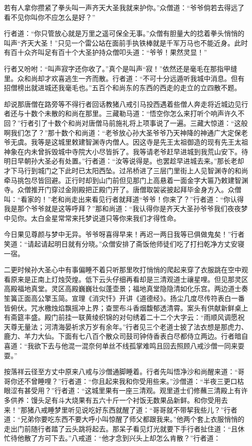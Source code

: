 \documentclass[12pt,UTF8]{ctexbook}
\begin{document}
若有人拿你攒紧了拳头叫一声齐天大圣我就来护你。”众僧道：“爷爷倘若去得远了看不见你叫你不应怎么是好？”

行者道：“你只管放心就是万里之遥可保全无事。”众僧有胆量大的捻着拳头悄悄的叫声“齐天大圣！”只见一个雷公站在面前手执铁棒就是千军万马也不能近身。此时有百十众齐叫足有百十个大圣护持众僧叩头道：“爷爷！果然灵显！”

行者又吩咐：“叫声寂字还你收了。”真个是叫声“寂！”依然还是毫毛在那指甲缝里。众和尚却才欢喜逃生一齐而散。行者道：“不可十分远遁听我城中消息。但有招僧榜出就进城还我毫毛也。”五百个和尚东的东西的西走的走立的立四散不题。

却说那唐僧在路旁等不得行者回话教猪八戒引马投西遇着些僧人奔走将近城边见行者还与十数个未散的和尚在那里。三藏勒马道：“悟空你怎么来打听个响声许久不回？”行者引了十数个和尚对唐僧马前施礼将上项事说了一遍。三藏大惊道：“这般啊我们怎了？”那十数个和尚道：“老爷放心孙大圣爷爷乃天神降的神通广大定保老爷无虞。我等是这城里敕建智渊寺内僧人。因这寺是先王太祖御造的现有先王太祖神象在内未曾拆毁城中寺院大小尽皆拆了。我等请老爷赶早进城到我荒山安下。待明日早朝孙大圣必有处置。”行者道：“汝等说得是。也罢趁早进城去来。”那长老却才下马行到城门之下此时已太阳西坠。过吊桥进了三层门里街上人见智渊寺的和尚牵马挑包尽皆回避。正行时却到山门前但见那门上高悬着一面金字大匾乃敕建智渊寺。众僧推开门穿过金刚殿把正殿门开了。唐僧取袈裟披起拜毕金身方入。众僧叫：“看家的！”老和尚走出来看见行者就拜道“爷爷！你来了？”行者道：“你认得我是那个爷爷就是这等呼拜？”那和尚道：“我认得你是齐天大圣孙爷爷我们夜夜梦中见你。太白金星常常来托梦说道只等你来我们才得性命。

今日果见尊颜与梦中无异。爷爷呀喜得早来！再迟一两日我等已俱做鬼矣！”行者笑道：“请起请起明日就有分晓。”众僧安排了斋饭他师徒们吃了打扫乾净方丈安寝一宿。

二更时候孙大圣心中有事偏睡不着只听那里吹打悄悄的爬起来穿了衣服跳在空中观看原来是正南上灯烛荧煌。低下云头仔细再看却是三清观道士禳星哩。但见那灵区高殿福地真堂。灵区高殿巍巍壮似蓬壶景；福地真堂隐隐清如化乐宫。两边道士奏笙簧正面高公擎玉简。宣理《消灾忏》开讲《道德经》。扬尘几度尽传符表白一番皆俯伏。咒水檄烛焰飘摇冲上界；查罡布斗香烟馥郁透清霄。案头有供献新鲜桌上有斋筵丰盛。殿门前挂一联黄绫织锦的对句绣着二十二个大字云：“雨顺风调愿祝天尊无量法；河清海晏祈求万岁有余年。”行者见三个老道士披了法衣想是那虎力、鹿力、羊力大仙。下面有七八百个散众司鼓司钟侍香表白尽都侍立两边。行者暗自喜道：“我欲下去与他混一混奈何单丝不线孤掌难鸣且回去照顾八戒沙僧一同来耍耍。”

按落祥云径至方丈中原来八戒与沙僧通脚睡着。行者先叫悟净沙和尚醒来道：“哥哥你还不曾睡哩？”行者道：“你且起来我和你受用些来。”沙僧道：“半夜三更口枯眼涩有甚受用？”行者道：“这城里果有一座三清观。观里道士们修蘸三清殿上有许多供养：馒头足有斗大烧果有五六十斤一个衬饭无数果品新鲜。和你受用去来！”那猪八戒睡梦里听见说吃好东西就醒了道：“哥哥就不带挈我些儿？”行者道：“兄弟你要吃东西不要大呼小叫惊醒了师父都跟我来。”他两个套上衣服悄悄的走出门前随行者踏了云头跳将起去。那呆子看见灯光就要下手行者扯住道：“且休忙待他散了方可下去。”八戒道：“他才念到兴头上却怎么肯散？”行者道：
\end{document}
